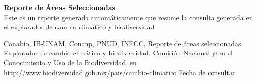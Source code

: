 \begin{titlepage}
\begin{center}
	\vspace{2.5cm}

	\textbf{Reporte de \'Areas Seleccionadas} \\
	Este es un reporte generado autom\'aticamente que resume la consulta generada en el explorador de cambio clim\'atico y biodiversidad
	\vspace{2cm}

\end{center}









\begin{flushleft}
\small{Conabio, IB-UNAM, Conanp, PNUD, INECC, Reporte de \'areas seleccionadas. Explorador de cambio clim\'atico y biodiversidad. Comisi\'on Nacional para el Conocimiento y Uso de la Biodiversidad, en \url{http://www.biodiversidad.gob.mx/pais/cambio-climatico} Fecha de consulta: }
\bigskip
\end{flushleft}


\end{titlepage}

